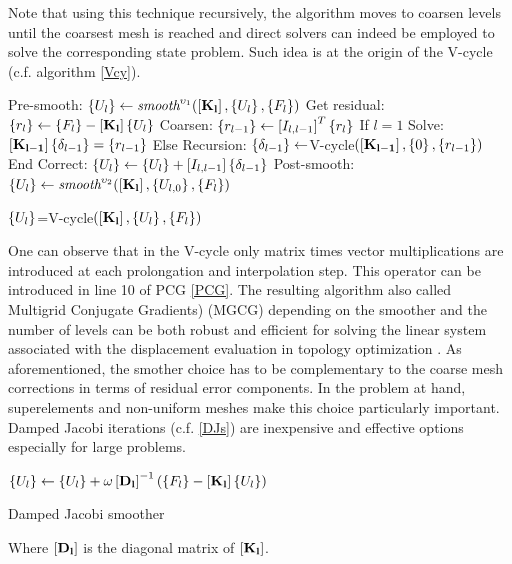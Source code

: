 Note that using this technique recursively, the algorithm moves to coarsen levels until the coarsest mesh is reached and direct solvers can indeed be employed to solve the corresponding state problem. Such idea is at the origin of the V-cycle (c.f. algorithm \ref{Vcy}).
  \begin{algorithm}
 Pre-smooth: $\left\lbrace{U_{l}}\right \rbrace\gets\textit{smooth}^{\upsilon_1}(\left[{\mathbf{K_{l}}}\right],\left\lbrace{U_{l}}\right \rbrace,\left\lbrace{F_{l}}\right \rbrace)$\;
 Get residual: $\left\lbrace{r_{l}}\right \rbrace\gets\left\lbrace{F_{l}}\right \rbrace-\left[{\mathbf{K_{l}}}\right]\left\lbrace{U_{l}}\right \rbrace$\;
 Coarsen: $\left\lbrace{r_{l-1}}\right \rbrace\gets\left[{I_{l,l-1}}\right]^T\left\lbrace{r_{l}}\right \rbrace$\;
If $l=1$\;
 Solve: $\left[{\mathbf{K_{l-1}}}\right]\left\lbrace{\delta_{l-1}}\right \rbrace=\left\lbrace{r_{l-1}}\right \rbrace$\;
 Else \;
 Recursion: $\left\lbrace{\delta_{l-1}}\right \rbrace\gets$V-cycle$(\left[{\mathbf{K_{l-1}}}\right],\left\lbrace{0}\right \rbrace,\left\lbrace{r_{l-1}}\right \rbrace)$\;
End \;
 Correct: $\left\lbrace{U_{l}}\right \rbrace\gets\left\lbrace{U_{l}}\right \rbrace+\left[{I_{l,l-1}}\right]\left\lbrace{\delta_{l-1}}\right \rbrace$\;
 Post-smooth: $\left\lbrace{U_{l}}\right \rbrace\gets\textit{smooth}^{\upsilon_2}(\left[{\mathbf{K_{l}}}\right],\left\lbrace{U_{l,0}}\right \rbrace,\left\lbrace{F_{l}}\right \rbrace)$\;
   \caption{$\left\lbrace{U_{l}}\right \rbrace$=V-cycle$(\left[{\mathbf{K_{l}}}\right],\left\lbrace{U_{l}}\right \rbrace,\left\lbrace{F_{l}}\right \rbrace)$ \label{Vcy}}
  \end{algorithm}
  One can observe that in the V-cycle only matrix times vector multiplications are introduced at each prolongation and interpolation step. This operator can be introduced in line 10 of PCG \ref{PCG}. The resulting algorithm also called Multigrid Conjugate Gradients) (MGCG) \cite{tatebe1994efficient,ashby1996parallel} depending on the smoother and the number of levels can be both robust and efficient for solving the linear system associated with the displacement evaluation in topology optimization \cite{amir2014multigrid,aage2017giga}. As aforementioned, the smother choice has to be complementary to the coarse mesh corrections in terms of residual error components. In the problem at hand, superelements and non-uniform meshes make this choice particularly important. Damped Jacobi iterations (c.f. \ref{DJs}) are inexpensive and effective options especially for large problems.
  \begin{algorithm}
 $\left\lbrace{U_{l}}\right \rbrace\gets\left\lbrace{U_{l}}\right \rbrace+\omega\left[{\mathbf{D_{l}}}\right]^{-1}\left(\left\lbrace{F_{l}}\right \rbrace-\left[{\mathbf{K_{l}}}\right]\left\lbrace{U_{l}}\right \rbrace\right)$\;
 \caption{Damped Jacobi smoother \label{DJs}}
  \end{algorithm}
  \clearpage
  Where $\left[{\mathbf{D_{l}}}\right]$ is the diagonal matrix of $\left[{\mathbf{K_{l}}}\right]$. 
